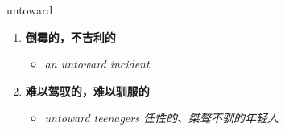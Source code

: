 
\begin{frame}
{\huge untoward}
\begin{center}
\begin{enumerate}\Large
  \item \textbf{倒霉的，不吉利的}
  \begin{itemize}
    \item \em{\Large{an untoward incident}}
  \end{itemize}
  \item \textbf{难以驾驭的，难以驯服的}
  \begin{itemize}
    \item \em{\Large{untoward teenagers 任性的、桀骜不驯的年轻人}}
  \end{itemize}
\end{enumerate}
\end{center}
\end{frame}
